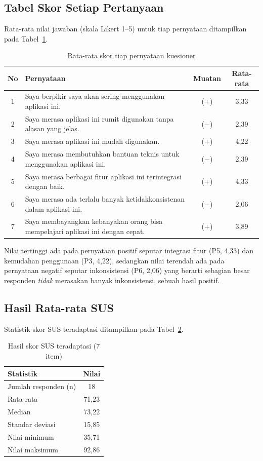\subsection{Tabel Skor Setiap Pertanyaan}
Rata-rata nilai jawaban (skala Likert 1--5) untuk tiap pernyataan ditampilkan pada Tabel~\ref{tab:skor-pertanyaan}.

\begin{table}[H]
\centering
\caption{Rata-rata skor tiap pernyataan kuesioner}
\label{tab:skor-pertanyaan}
\renewcommand{\arraystretch}{1.3}
\begin{tabular}{|c|p{9.5cm}|c|c|}
\hline
\textbf{No} & \textbf{Pernyataan} & \textbf{Muatan} & \textbf{Rata-rata} \\
\hline
1 & Saya berpikir saya akan sering menggunakan aplikasi ini. & (+) & 3,33 \\
\hline
2 & Saya merasa aplikasi ini rumit digunakan tanpa alasan yang jelas. & ($-$) & 2,39 \\
\hline
3 & Saya merasa aplikasi ini mudah digunakan. & (+) & 4,22 \\
\hline
4 & Saya merasa membutuhkan bantuan teknis untuk menggunakan aplikasi ini. & ($-$) & 2,39 \\
\hline
5 & Saya merasa berbagai fitur aplikasi ini terintegrasi dengan baik. & (+) & 4,33 \\
\hline
6 & Saya merasa ada terlalu banyak ketidakkonsistenan dalam aplikasi ini. & ($-$) & 2,06 \\
\hline
7 & Saya membayangkan kebanyakan orang bisa mempelajari aplikasi ini dengan cepat. & (+) & 3,89 \\
\hline
\end{tabular}
\end{table}

Nilai tertinggi ada pada pernyataan positif seputar integrasi fitur (P5, 4,33) dan kemudahan penggunaan (P3, 4,22), sedangkan nilai terendah ada pada pernyataan negatif seputar inkonsistensi (P6, 2,06) yang berarti sebagian besar responden \textit{tidak} merasakan banyak inkonsistensi, sebuah hasil positif.

\subsection{Hasil Rata-rata SUS}
Statistik skor SUS teradaptasi ditampilkan pada Tabel~\ref{tab:skor-sus}.

\begin{table}[H]
\centering
\caption{Hasil skor SUS teradaptasi (7 item)}
\label{tab:skor-sus}
\renewcommand{\arraystretch}{1.3}
\begin{tabular}{|l|c|}
\hline
\textbf{Statistik} & \textbf{Nilai} \\
\hline
Jumlah responden (n) & 18 \\
\hline
Rata-rata & 71,23 \\
\hline
Median & 73,22 \\
\hline
Standar deviasi & 15,85 \\
\hline
Nilai minimum & 35,71 \\
\hline
Nilai maksimum & 92,86 \\
\hline
\end{tabular}
\end{table}

